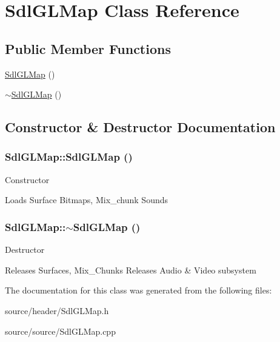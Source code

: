 \hypertarget{classSdlGLMap}{
\section{SdlGLMap Class Reference}
\label{d9/d4a/classSdlGLMap}
}
\subsection*{Public Member Functions}
\begin{DoxyCompactItemize}
\item 
\hyperlink{classSdlGLMap_a8f8c64f935f9604c1d4874bcc0c7ca0d}{SdlGLMap} ()
\item 
\hyperlink{classSdlGLMap_a772938300f573106c2a124487250b273}{$\sim$SdlGLMap} ()
\end{DoxyCompactItemize}


\subsection{Constructor \& Destructor Documentation}
\hypertarget{classSdlGLMap_a8f8c64f935f9604c1d4874bcc0c7ca0d}{
\subsubsection[{SdlGLMap}]{\setlength{\rightskip}{0pt plus 5cm}SdlGLMap::SdlGLMap ()}}
\label{d9/d4a/classSdlGLMap_a8f8c64f935f9604c1d4874bcc0c7ca0d}
Constructor

Loads Surface Bitmaps, Mix\_\-chunk Sounds \hypertarget{classSdlGLMap_a772938300f573106c2a124487250b273}{
\subsubsection[{$\sim$SdlGLMap}]{\setlength{\rightskip}{0pt plus 5cm}SdlGLMap::$\sim$SdlGLMap ()}}
\label{d9/d4a/classSdlGLMap_a772938300f573106c2a124487250b273}
Destructor

Releases Surfaces, Mix\_\-Chunks Releases Audio \& Video subsystem 

The documentation for this class was generated from the following files:\begin{DoxyCompactItemize}
\item 
source/header/SdlGLMap.h\item 
source/source/SdlGLMap.cpp\end{DoxyCompactItemize}
